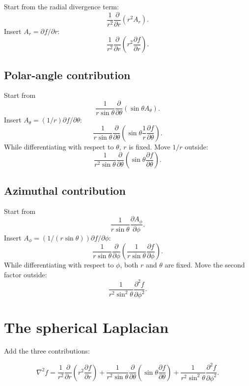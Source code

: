 \documentclass[11pt,a4paper]{article}
\begin{document}
Start from the radial divergence term:
\[
  \frac{1}{r^2}\frac{\partial}{\partial r}(r^2A_r).
\]
Insert \(A_r=\partial f/\partial r\):
\[
  \boxed{
  \frac{1}{r^2}\frac{\partial}{\partial r}
  \left(r^2\frac{\partial f}{\partial r}\right)}.
\]

\subsection{Polar-angle contribution}

Start from
\[
  \frac{1}{r\sin\theta}
  \frac{\partial}{\partial\theta}(\sin\theta A_\theta).
\]
Insert \(A_\theta=(1/r)\partial f/\partial\theta\):
\[
  \frac{1}{r\sin\theta}
  \frac{\partial}{\partial\theta}
  \left(\sin\theta\frac{1}{r}
  \frac{\partial f}{\partial\theta}\right).
\]
While differentiating with respect to \(\theta\), \(r\) is fixed. Move \(1/r\) outside:
\[
  \boxed{
  \frac{1}{r^2\sin\theta}
  \frac{\partial}{\partial\theta}
  \left(\sin\theta\frac{\partial f}{\partial\theta}\right)}.
\]

\subsection{Azimuthal contribution}

Start from
\[
  \frac{1}{r\sin\theta}\frac{\partial A_\phi}{\partial\phi}.
\]
Insert \(A_\phi=(1/(r\sin\theta))\partial f/\partial\phi\):
\[
  \frac{1}{r\sin\theta}
  \frac{\partial}{\partial\phi}
  \left(\frac{1}{r\sin\theta}
  \frac{\partial f}{\partial\phi}\right).
\]
While differentiating with respect to \(\phi\), both \(r\) and \(\theta\) are fixed. Move the second factor outside:
\[
  \boxed{
  \frac{1}{r^2\sin^2\theta}
  \frac{\partial^2 f}{\partial\phi^2}}.
\]

\clearpage

\section{The spherical Laplacian}

Add the three contributions:
\begin{result}
\[
\boxed{
\nabla^2 f
=\frac{1}{r^2}\frac{\partial}{\partial r}
  \left(r^2\frac{\partial f}{\partial r}\right)
+\frac{1}{r^2\sin\theta}\frac{\partial}{\partial\theta}
  \left(\sin\theta\frac{\partial f}{\partial\theta}\right)
+\frac{1}{r^2\sin^2\theta}
  \frac{\partial^2 f}{\partial\phi^2}.}
\]
\end{result}
\end{document}
